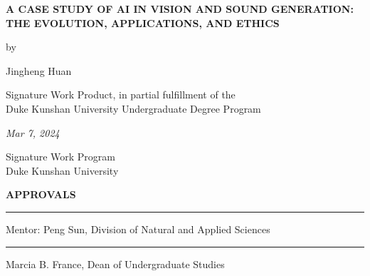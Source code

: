 \documentclass[11pt,a4paper,oneside]{report}
\begin{document}
\onehalfspacing

\newcommand{\authorname}{Jingheng Huan}

\newcommand{\thetitle}{A CASE STUDY OF AI IN VISION AND SOUND GENERATION: THE EVOLUTION, APPLICATIONS, AND ETHICS}

\newcommand{\submissiondate}{Mar 7, 2024}

\newcommand{\mentor}{Peng Sun}

\newcommand{\academicunit}{Division of Natural and Applied Sciences}






\begin{titlepage}

\vspace*{\bigskipamount}

\begin{center}
{\sffamily\LARGE\bfseries\MakeUppercase\thetitle\par}

\bigskip

by

\bigskip

{\Large \authorname}

\bigskip

Signature Work Product, in partial fulfillment of the \\
Duke Kunshan University Undergraduate Degree Program

\bigskip

\emph{\submissiondate}

\bigskip

Signature Work Program \\
Duke Kunshan University

\end{center}

\vfill

\textbf{\textsf{APPROVALS}}

\bigskip\bigskip\bigskip
\hrule

Mentor: \mentor, \academicunit

\bigskip\bigskip\bigskip
\hrule

Marcia B. France, Dean of Undergraduate Studies

\end{titlepage}
\end{document}
